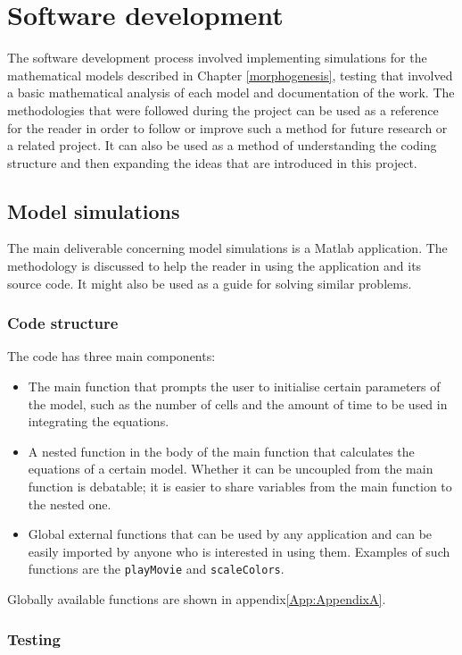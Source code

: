 \chapter{Software development}
\label{softD}
The software development process involved implementing simulations for the mathematical models described in Chapter \ref{morphogenesis}, 
testing that involved a basic mathematical analysis of each model and documentation of the work.
The methodologies that were followed during the project can be used as a reference for the reader in order to follow or improve such a method for future research or a related project. It can also be used as a method of understanding the coding structure and then expanding the ideas that are introduced in this project.

\section{Model simulations}
The main deliverable concerning model simulations is a Matlab application. The methodology is discussed to help the reader in using the application and its source code. It might also be used as a guide for solving similar problems.  

\subsection{Code structure}
The code has three main components:
\begin{itemize}
\item The main function that prompts the user to initialise certain parameters of the model, such as the number of cells and the amount of time to be used in integrating the equations.
\item A nested function in the body of the main function that calculates the equations of a certain model. Whether it can be uncoupled from the main function is debatable; it is easier to share variables from the main function to the nested one.
\item Global external functions that can be used by any application and can be easily imported by anyone who is interested in using them. Examples of such functions are the \texttt{playMovie} and \texttt{scaleColors}.
\end{itemize}
Globally available functions are shown in appendix\ref{App:AppendixA}.


\subsection{Testing}

